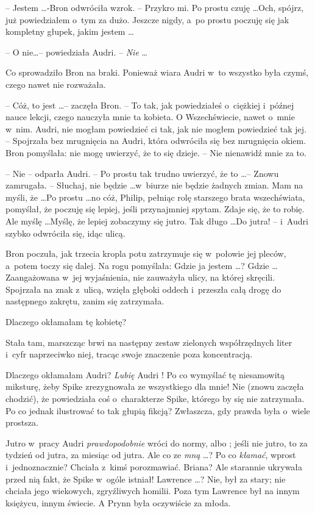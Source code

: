 \documentclass[oneside,polish,11pt,rmheadings]{mwbk}
\begin{document}
-- Jestem \ldots   -Bron odwróciła wzrok. -- Przykro mi. Po prostu czuję \ldots  Och, spójrz, już powiedziałem o~tym za dużo. Jeszcze nigdy, a~po prostu poczuję się jak kompletny głupek, jakim jestem \ldots  

-- O nie\ldots  --  powiedziała Audri. -- \textit{ Nie }\ldots  

Co sprowadziło Bron na braki. Ponieważ wiara Audri w~to wszystko była czymś, czego nawet nie rozważała. 

-- Cóż, to jest \ldots  -- zaczęła Bron. -- To tak, jak powiedziałeś o~ciężkiej i~późnej nauce lekcji, czego nauczyła mnie ta kobieta. O Wszechświecie, nawet o~mnie w~nim. Audri, nie mogłam powiedzieć ci tak, jak nie mogłem powiedzieć tak jej. -- Spojrzała bez mrugnięcia na Audri, która odwróciła się bez mrugnięcia okiem. Bron pomyślała: nie mogę uwierzyć, że to się dzieje. -- Nie nienawidź mnie za to. 

-- Nie -- odparła Audri. -- Po prostu tak trudno uwierzyć, że to \ldots  -- Znowu zamrugała. -- Słuchaj, nie będzie \ldots  w~biurze nie będzie żadnych zmian. Mam na myśli, że \ldots  Po prostu \ldots  no cóż, Philip, pełniąc rolę starszego brata wszechświata, pomyślał, że poczuję się lepiej, jeśli przynajmniej spytam. Zdaje się, że to robię. Ale myślę \ldots  Myślę, że lepiej zobaczymy się jutro. Tak długo \ldots  Do jutra! --  i~Audri szybko odwróciła się, idąc ulicą. 

Bron poczuła, jak trzecia kropla potu zatrzymuje się w~połowie jej pleców, a~potem toczy się dalej. Na rogu pomyślała: Gdzie ja jestem \ldots ? Gdzie \ldots  Zaangażowana w~jej wyjaśnienia, nie zauważyła ulicy, na której skręcili. Spojrzała na znak z~ulicą, wzięła głęboki oddech i~przeszła całą drogę do następnego zakrętu, zanim się zatrzymała. 

Dlaczego okłamałam tę kobietę? 

Stała tam, marszcząc brwi na następny zestaw zielonych współrzędnych liter i~cyfr naprzeciwko niej, tracąc swoje znaczenie poza koncentracją. 

Dlaczego okłamałam Audri? \textit{Lubię }Audri ! Po co wymyślać tę niesamowitą miksturę, żeby Spike zrezygnowała ze wszystkiego dla mnie! Nie (znowu zaczęła chodzić), że powiedziała coś o~charakterze Spike, którego by się nie zatrzymała. Po co jednak ilustrować to tak głupią fikcją? Zwłaszcza, gdy prawda była o~wiele prostsza. 

Jutro w~pracy Audri \textit{prawdopodobnie }wróci do normy, albo ; jeśli nie jutro, to za tydzień od jutra, za miesiąc od jutra. Ale co ze \textit{mną}  \ldots ? Po co \textit{kłamać}, wprost i~jednoznacznie? Chciała z~kimś porozmawiać. Briana? Ale starannie ukrywała przed nią fakt, że Spike w~ogóle istniał! Lawrence \ldots ? Nie, był za stary; nie chciała jego wiekowych, zgryźliwych homilii. Poza tym Lawrence był na innym księżycu, innym świecie. A Prynn była oczywiście za młoda. 
\end{document}
